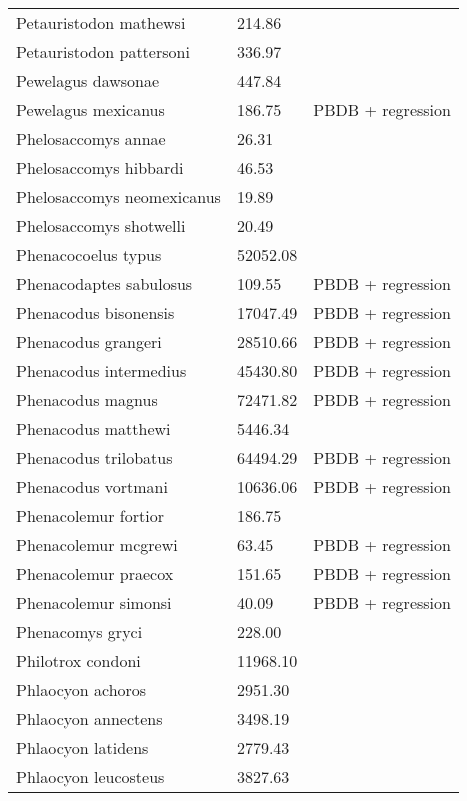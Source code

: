 \documentclass{article}
\begin{document}
\begin{center}
\begin{longtable}{p{} p{} p{} }
  Petauristodon mathewsi & 214.86 & \cite{Tomiya2013} \\ 
  Petauristodon pattersoni & 336.97 & \cite{Tomiya2013} \\ 
  Pewelagus dawsonae & 447.84 & \cite{Jepsen1932} \\ 
  Pewelagus mexicanus & 186.75 & PBDB + regression \\ 
  Phelosaccomys annae & 26.31 & \cite{Tomiya2013} \\ 
  Phelosaccomys hibbardi & 46.53 & \cite{Tomiya2013} \\ 
  Phelosaccomys neomexicanus & 19.89 & \cite{Tomiya2013} \\ 
  Phelosaccomys shotwelli & 20.49 & \cite{Tomiya2013} \\ 
  Phenacocoelus typus & 52052.08 & \cite{Tomiya2013} \\ 
  Phenacodaptes sabulosus & 109.55 & PBDB + regression \\ 
  Phenacodus bisonensis & 17047.49 & PBDB + regression \\ 
  Phenacodus grangeri & 28510.66 & PBDB + regression \\ 
  Phenacodus intermedius & 45430.80 & PBDB + regression \\ 
  Phenacodus magnus & 72471.82 & PBDB + regression \\ 
  Phenacodus matthewi & 5446.34 & \cite{Cope1871} \\ 
  Phenacodus trilobatus & 64494.29 & PBDB + regression \\ 
  Phenacodus vortmani & 10636.06 & PBDB + regression \\ 
  Phenacolemur fortior & 186.75 & \cite{Wood1962} \\ 
  Phenacolemur mcgrewi & 63.45 & PBDB + regression \\ 
  Phenacolemur praecox & 151.65 & PBDB + regression \\ 
  Phenacolemur simonsi & 40.09 & PBDB + regression \\ 
  Phenacomys gryci & 228.00 & \cite{McKenna2011} \\ 
  Philotrox condoni & 11968.10 & \cite{Tomiya2013} \\ 
  Phlaocyon achoros & 2951.30 & \cite{Tomiya2013} \\ 
  Phlaocyon annectens & 3498.19 & \cite{Tomiya2013} \\ 
  Phlaocyon latidens & 2779.43 & \cite{Tomiya2013} \\ 
  Phlaocyon leucosteus & 3827.63 & \cite{Tomiya2013} \\ 

\end{longtable}
\end{center}
\end{document}
